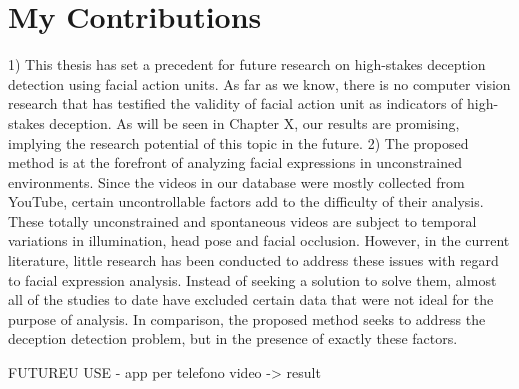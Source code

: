\section{My Contributions} \label{contrib}
1) This thesis has set a precedent for future research on high-stakes deception detection using facial action units. As far as we know, there is no computer vision research that has testified the validity of facial action unit as indicators of high-stakes deception. As will be seen in Chapter X, our results are promising, implying the research potential of this topic in the future.
2) The proposed method is at the forefront of analyzing facial expressions in unconstrained environments. Since the videos in our database were mostly collected from YouTube, certain uncontrollable factors add to the difficulty of their analysis. \\
These totally unconstrained and spontaneous videos are subject to temporal variations in illumination, head pose and facial occlusion. However, in the current literature, little research has been conducted to address these issues with regard to facial expression analysis. Instead of seeking a solution to solve them, almost all of the studies to date have excluded certain data that were not ideal for the purpose of analysis. In comparison, the proposed method seeks to address the deception detection problem, but in the presence of exactly these factors.

FUTUREU USE - app per telefono video -> result

\pagebreak